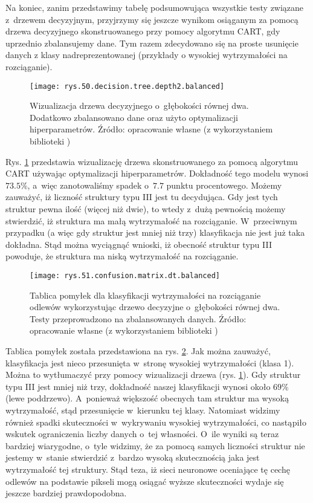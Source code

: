 Na koniec, zanim przedstawimy tabelę podsumowująca wszystkie testy związane z~drzewem decyzyjnym, przyjrzymy się jeszcze wynikom osiąganym za pomocą drzewa decyzyjnego skonstruowanego przy pomocy algorytmu CART, gdy uprzednio zbalansujemy dane. Tym razem zdecydowano się na proste usunięcie danych z klasy nadreprezentowanej (przykłady o wysokiej wytrzymałości na rozciąganie).
\begin{figure}[h]
    \centering
    \texttt{[image: rys.50.decision.tree.depth2.balanced]}
    \caption{Wizualizacja drzewa decyzyjnego o~głębokości równej dwa. Dodatkowo zbalansowano dane oraz użyto optymalizacji hiperparametrów. Źródło: opracowanie własne (z wykorzystaniem biblioteki )}
    \label{rys.50.decision.tree.depth2.balanced}
\end{figure}
Rys. \ref{rys.50.decision.tree.depth2.balanced} przedstawia wizualizację drzewa skonstruowanego za pomocą algorytmu CART używając optymalizacji hiperparametrów. Dokładność tego modelu wynosi $73.5\%$, a~więc zanotowaliśmy spadek o~$7.7$ punktu procentowego. 
Możemy zauważyć, iż liczność struktury typu III jest tu decydująca. Gdy jest tych struktur pewna ilość (więcej niż dwie), to wtedy z~dużą pewnością możemy stwierdzić, iż struktura ma małą wytrzymałość na rozciąganie. W~przeciwnym przypadku (a więc gdy struktur jest mniej niż trzy) klasyfikacja nie jest już taka dokładna. Stąd można wyciągnąć wnioski, iż obecność struktur typu III powoduje, że struktura ma niską wytrzymałość na rozciąganie.
\begin{figure}[h]
    \centering
    \texttt{[image: rys.51.confusion.matrix.dt.balanced]}
    \caption{Tablica pomyłek dla klasyfikacji wytrzymałości na rozciąganie odlewów wykorzystując drzewo decyzyjne o~głębokości równej dwa. Testy przeprowadzono na zbalansowanych danych. Źródło: opracowanie własne (z wykorzystaniem biblioteki )}
    \label{rys.51.confusion.matrix.dt.balanced}
\end{figure}
Tablica pomyłek została przedstawiona na rys. \ref{rys.51.confusion.matrix.dt.balanced}. Jak można zauważyć, klasyfikacja jest nieco przesunięta w~stronę wysokiej wytrzymałości (klasa 1). Można to wytłumaczyć przy pomocy wizualizacji drzewa (rys. \ref{rys.50.decision.tree.depth2.balanced}). Gdy struktur typu III jest mniej niż trzy, dokładność naszej klasyfikacji wynosi około $69\%$ (lewe poddrzewo). A~ponieważ większość obecnych tam struktur ma wysoką wytrzymałość, stąd przesunięcie w~kierunku tej klasy. Natomiast widzimy również spadki skuteczności w~wykrywaniu wysokiej wytrzymałości, co nastąpiło wskutek ograniczenia liczby danych o~tej własności. O~ile wyniki są teraz bardziej wiarygodne, o~tyle widzimy, że za pomocą samych liczności struktur nie jestemy w~stanie stwierdzić z~bardzo wysoką skutecznością jaka jest wytrzymałość tej struktury. Stąd teza, iż sieci neuronowe oceniające tę cechę odlewów na podstawie pikseli mogą osiągać wyższe skuteczności wydaje się jeszcze bardziej prawdopodobna. 

